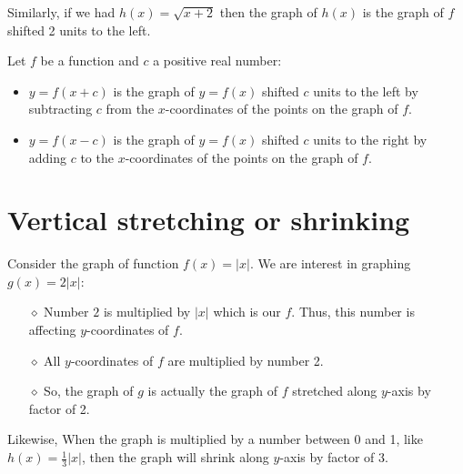 Similarly, if we had $h(x)=\sqrt{x+2}$ then the graph of $h(x)$ is the graph of $f$ shifted 2 units to the left.
\begin{tcolorbox}[title=Horizontal shifts,fonttitle=\bfseries,
colframe=blue!75!black,colback=blue!10!white]
Let $f$ be a function and $c$ a positive real number:
\begin{itemize}[noitemsep]
    \item $y=f(x+c)$ is the graph of $y=f(x)$ shifted $c$ units to the left  by subtracting $c$ from the $x$-coordinates of the points on the graph of $f$.
    \item $y=f(x-c)$ is the graph of $y=f(x)$ shifted $c$ units to the right by adding $c$ to the $x$-coordinates of the points on the graph of $f$.
\end{itemize}
\end{tcolorbox}
\section{Vertical stretching or shrinking}
Consider the graph of function $f(x)=|x|$. We are interest in graphing $g(x) = 2|x|$:
\begin{itemize}
    \item [$\diamond$] Number $2$ is multiplied by $|x|$ which is our $f$. Thus, this number is affecting $y$-coordinates of $f$. 
    \item [$\diamond$] All $y$-coordinates of $f$ are multiplied by number 2.
    \item [$\diamond$] So, the graph of $g$ is actually the graph of $f$ stretched along $y$-axis by factor of 2.
\end{itemize}
Likewise, When the graph is multiplied by a number between 0 and 1, like $h(x)=\frac{1}{3}|x|$, then the graph will shrink along $y$-axis by factor of $3$. 

